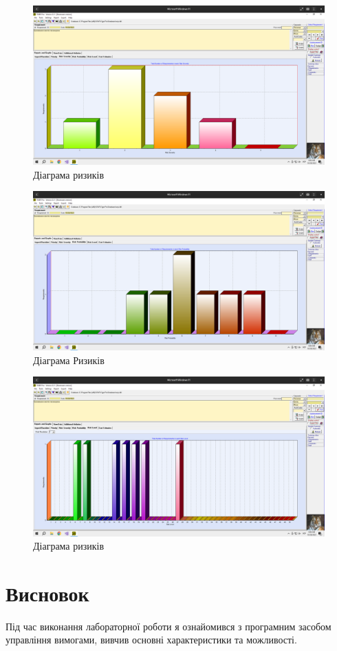 \documentclass[14pt]{extreport}
\begin{document}
\begin{normalsize}
	\begin{figure}[H]
		\centering
		\includegraphics[scale=0.25]{6}
		\caption{Діаграма ризиків}
	\end{figure}
	
	\begin{figure}[H]
		\centering
		\includegraphics[scale=0.25]{7}
		\caption{Діаграма Ризиків}
	\end{figure}
	
	\begin{figure}[H]
		\centering
		\includegraphics[scale=0.25]{8}
		\caption{Діаграма ризиків}
	\end{figure}
	\section*{Висновок}
	Під час виконання лабораторної роботи я ознайомився з програмним засобом управління вимогами, вивчив основні характеристики та можливості.
	
\end{normalsize}
\end{document}
